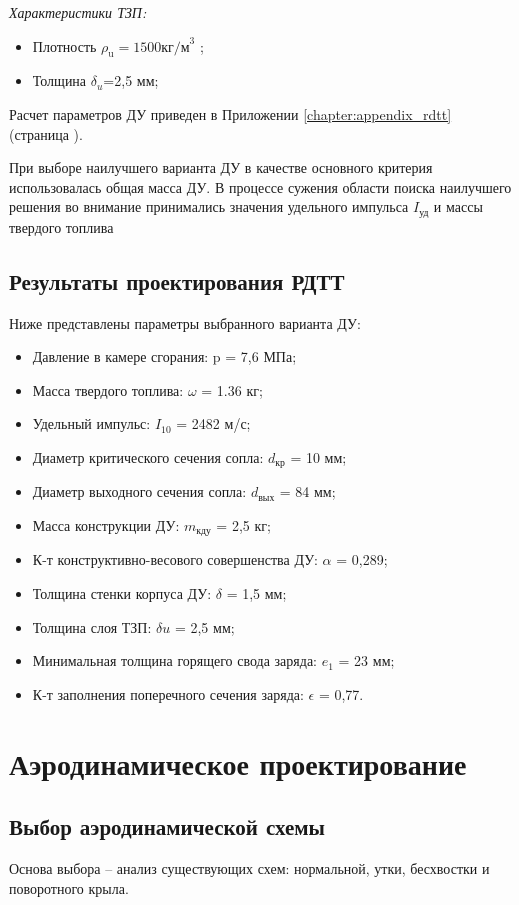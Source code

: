 \emph{Характеристики ТЗП:}

\begin{itemize}
	\item Плотность $\rho_\text{u}=1500  \text{кг/м}^3$ ;
	\item Толщина $\delta_u$=2,5 мм;
\end{itemize}

Расчет параметров ДУ приведен в Приложении \ref{chapter:appendix_rdtt} (страница \pageref{chapter:appendix_rdtt}).

При выборе наилучшего варианта ДУ в качестве основного критерия использовалась общая масса ДУ. В процессе сужения области поиска наилучшего решения во внимание принимались значения удельного импульса $I_{\text{уд}}$ и массы твердого топлива

\subsection{Результаты проектирования РДТТ}
Ниже представлены параметры выбранного варианта ДУ:
\begin{itemize}
	\item Давление в камере сгорания:				p = 7,6 МПа;
	\item Масса твердого топлива:					$\omega$ = 1.36 кг; 
	\item Удельный импульс:						$I_{10}$ = 2482 м/с; 
	\item Диаметр критического сечения сопла:			$d_{\text{кр}}$ = 10  мм; 
	\item Диаметр выходного сечения сопла:				$d_{\text{вых}}$ = 84 мм;
	\item Масса конструкции ДУ:					$m_{\text{кду}}$ = 2,5 кг; 
	\item К-т конструктивно-весового совершенства ДУ:		$\alpha$ = 0,289; 
	\item Толщина стенки корпуса ДУ:					$\delta$ = 1,5 мм; 
	\item Толщина слоя ТЗП:						$\delta u$ = 2,5 мм; 
	\item Минимальная толщина горящего свода заряда:		$e_1$ = 23 мм;
	\item К-т заполнения поперечного сечения заряда:		$\epsilon$ = 0,77.
\end{itemize}


\clearpage
\section{Аэродинамическое проектирование}
\subsection{Выбор аэродинамической схемы}
Основа выбора – анализ существующих схем: нормальной, утки, бесхвостки и поворотного крыла.

